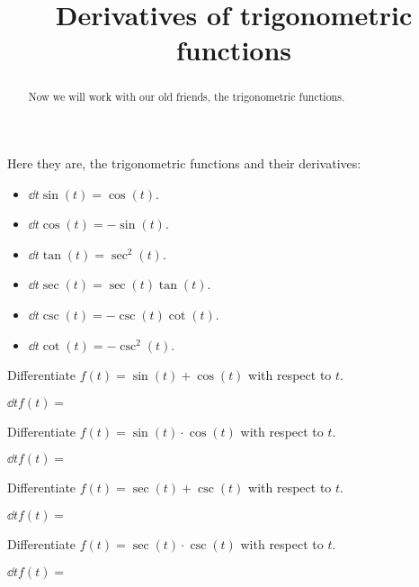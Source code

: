 \documentclass{ximera}
\title{Derivatives of trigonometric functions}
\begin{document}
\begin{abstract}
  Now we will work with our old friends, the trigonometric functions. 
\end{abstract}
\maketitle

Here they are, the trigonometric functions and their derivatives:


\begin{theorem} \hfil
\begin{itemize}
\item $\dd{t} \sin(t) = \cos(t)$.
\item $\dd{t} \cos(t) = -\sin(t)$.
\item $\dd{t} \tan(t) = \sec^2(t)$.
\item $\dd{t} \sec(t) = \sec(t)\tan(t)$.
\item $\dd{t} \csc(t) = -\csc(t)\cot(t)$.
\item $\dd{t} \cot(t) = -\csc^2(t)$.
\end{itemize}
\end{theorem}


\begin{question}
  Differentiate $f(t) = \sin(t) + \cos(t)$ with respect to $t$.
  \begin{prompt}
    $\dd{t} f(t) = $
  \end{prompt}
\end{question}

\begin{question}
  Differentiate $f(t) = \sin(t)\cdot\cos(t)$ with respect to $t$.
  \begin{prompt}
    $\dd{t} f(t) = $
  \end{prompt}
\end{question}


\begin{question}
  Differentiate $f(t) = \sec(t) + \csc(t)$ with respect to $t$.
  \begin{prompt}
    $\dd{t} f(t) = $
  \end{prompt}
\end{question}

\begin{question}
  Differentiate $f(t) = \sec(t)\cdot\csc(t)$ with respect to $t$.
  \begin{prompt}
    $\dd{t} f(t) = $
  \end{prompt}
\end{question}
\end{document}

